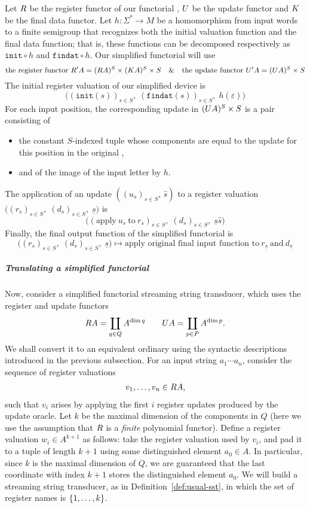 Let $\functorr$ be the register functor of our functorial \sst, $\functoru$ be the update functor and $\functork$ be the final data functor. Let $h\colon \Sigma^* \to M$ be a homomorphism from input words to a finite semigroup that recognizes both the initial valuation function and the final data function; that is, these functions can be decomposed respectively as $\mathtt{init}\circ h$ and $\mathtt{findat}\circ h$. Our simplified functorial \sst will use
\[ \text{the register functor}\ \functorr'A = (\functorr A)^S \times (\functork A)^S \times S \quad\text{\&}\quad \text{the update functor}\ \functoru'A = (\functoru A)^S \times S \]
The initial register valuation of our simplified device is
\[ \big((\mathtt{init}(s))_{s\in S},\; (\mathtt{findat}(s))_{s\in S},\; h(\varepsilon)\big) \]
For each input position, the corresponding update in $(\functoru A)^S \times S$ is a pair consisting of
\begin{itemize}
  \item the constant $S$-indexed tuple whose components are equal to the update for this position in the original \sst,
  \item and of the image of the input letter by $h$.
\end{itemize}
The application of an update $((u_s)_{s\in S},\, \widehat{s})$ to a register valuation $\big((r_s)_{s\in S},\; (d_s)_{s\in S},\; \underline{s}\big)$ is
\[ \big((\text{apply}\ u_s\ \text{to}\ r_s)_{s\in S},\; (d_s)_{s\in S},\; \underline{s}\widehat{s}\big) \]
Finally, the final output function of the simplified functorial \sst is
\[ \big((r_s)_{s\in S},\; (d_s)_{s\in S},\; \underline{s}\big) \mapsto \text{apply original final input function to}\ r_{\underline{s}}\ \text{and}\ d_{\underline{s}}  \]

\subparagraph{Translating a simplified functorial \sst}

Now, consider a simplified functorial streaming string transducer, which uses the register and update functors 
\begin{align*} 
\functorr A = \coprod_{q \in Q} A^{\dim q} \qquad 
\functoru A = \coprod_{p \in P} A^{\dim p}.
\end{align*}
We shall convert it to an equivalent ordinary \sst using the syntactic descriptions introduced in the previous subsection.
For an input string $a_1 \cdots a_n$, consider the sequence of register valuations 
\begin{align*}
v_1,\ldots,v_n \in \functorr A,
\end{align*}
such that $v_i$ arises by applying the first $i$ register updates produced by the update oracle. Let $k$ be the maximal dimension of the components in $Q$ (here we use the assumption that $\functorr$ is a \emph{finite} polynomial functor). Define a register valuation $w_i \in A^{k+1}$ as follows: take the register valuation used by $v_i$, and pad it to a tuple of length  $k+1$ using some distinguished element $a_0 \in A$. In particular, since $k$ is the maximal dimension of $Q$, we are guaranteed that the last coordinate with index $k+1$ stores the distinguished element $a_0$. We will build a streaming string transducer, as in Definition~\ref{def:usual-sst}, in which the set of register names is $\{1,\ldots,k\}$. 

